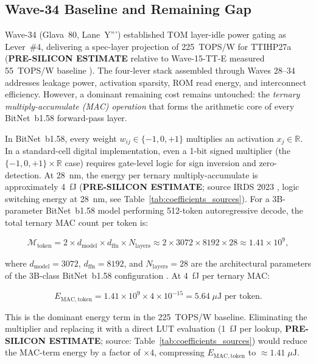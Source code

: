 \subsection{Wave-34 Baseline and Remaining Gap}

Wave-34 (Glava~80, Lane~Y''') established TOM layer-idle power gating as
Lever~\#4, delivering a spec-layer projection of 225~TOPS/W for TTIHP27a
(\textbf{PRE-SILICON ESTIMATE} relative to Wave-15-TT-E measured 55~TOPS/W
baseline \cite{bitnet_b158_2024}).  The four-lever stack assembled through
Waves 28--34 addresses leakage power, activation sparsity, ROM read energy,
and interconnect efficiency.  However, a dominant remaining cost remains
untouched: the \emph{ternary multiply-accumulate (MAC) operation} that forms
the arithmetic core of every BitNet~b1.58 \cite{bitnet_b158_2024} forward-pass
layer.

In BitNet~b1.58, every weight $w_{ij} \in \{-1, 0, +1\}$ multiplies an
activation $x_j \in \mathbb{R}$.  In a standard-cell digital implementation,
even a 1-bit signed multiplier (the $\{-1,0,+1\} \times \mathbb{R}$ case)
requires gate-level logic for sign inversion and zero-detection.  At 28~nm,
the energy per ternary multiply-accumulate is approximately 4~fJ
(\textbf{PRE-SILICON ESTIMATE}; source IRDS 2023 \cite{irds2023}, logic switching
energy at 28~nm, see Table~\ref{tab:coefficients_sources}).  For a 3B-parameter
BitNet~b1.58 model performing 512-token autoregressive decode, the total
ternary MAC count per token is:

\begin{equation}
  \mathcal{M}_{\mathrm{token}} = 2 \times d_{\mathrm{model}} \times d_{\mathrm{ffn}}
  \times N_{\mathrm{layers}} \approx 2 \times 3072 \times 8192 \times 28
  \approx 1.41 \times 10^9,
  \label{eq:mac_count}
\end{equation}

\noindent where $d_{\mathrm{model}} = 3072$, $d_{\mathrm{ffn}} = 8192$, and
$N_{\mathrm{layers}} = 28$ are the architectural parameters of the 3B-class
BitNet~b1.58 configuration \cite{bitnet_b158_2024}.  At 4~fJ per ternary MAC:

\[
  E_{\mathrm{MAC, token}} = 1.41 \times 10^9 \times 4 \times 10^{-15}
  = 5.64 \; \mu\text{J per token.}
\]

\noindent This is the dominant energy term in the 225~TOPS/W baseline.
Eliminating the multiplier and replacing it with a direct LUT evaluation
(1~fJ per lookup, \textbf{PRE-SILICON ESTIMATE}; source: Table~\ref{tab:coefficients_sources})
would reduce the MAC-term energy by a factor of $\times 4$, compressing
$E_{\mathrm{MAC, token}}$ to $\approx 1.41\;\mu\text{J}$.

